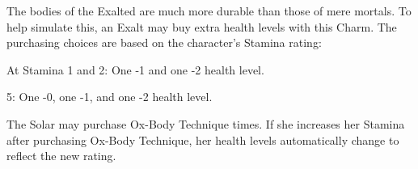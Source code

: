
The bodies of the Exalted are much more durable than those of mere mortals. To
help simulate this, an Exalt may buy extra health levels with this Charm. The
purchasing choices are based on the character's Stamina rating:

At Stamina 1 and 2: One -1 and one -2 health level.


5: One -0, one -1, and one -2 health level.

The Solar may purchase Ox-Body Technique  times. If she
increases her Stamina after purchasing Ox-Body Technique, her health levels
automatically change to reflect the new rating.


\printbibliography[title=References]



\onecolumn

\PrintCharmList


